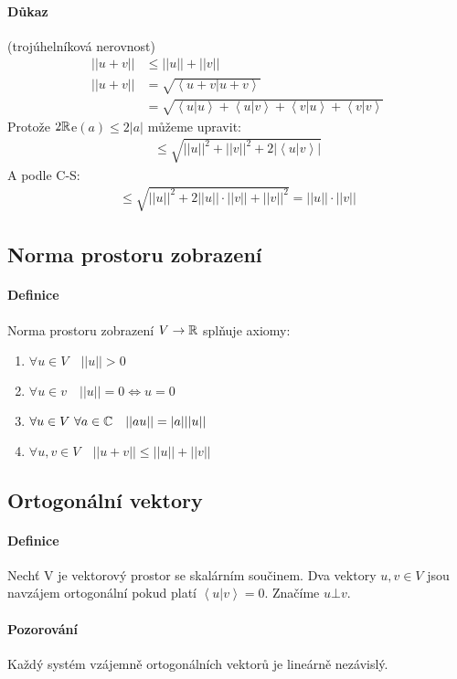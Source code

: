 \documentclass[a4paper,10pt]{article}
\begin{document}
\paragraph{Důkaz} (trojúhelníková nerovnost)
\begin{align}
	||u+v|| &\le ||u|| + ||v|| \\
	||u+v|| &= \sqrt{\left<u+v|u+v\right>}\\
	&=\sqrt{\left<u|u\right> + \left<u|v\right> + \left<v|u\right> + \left<v|v\right>}
\end{align}
Protože $2 \mathbb{R} $e$(a) \le 2|a|$ můžeme upravit:
\begin{align}
	\le \sqrt{||u||^2 + ||v||^2 + 2|\left<u|v\right>|}
\end{align}
A podle C-S:
\begin{align}
	\le \sqrt{||u||^2 + 2||u|| \cdot ||v|| + ||v||^2} = ||u|| \cdot ||v||
\end{align}


\subsection{Norma prostoru zobrazení}
\setcounter{equation}{0}
\paragraph{Definice}
Norma prostoru zobrazení $V \to \mathbb{R}$ splňuje axiomy:
\begin{enumerate}
	\item $\forall u \in V \quad ||u|| \gt 0$
	\item $\forall u \in v \quad ||u|| = 0 \Leftrightarrow u = 0$
	\item $\forall u \in V \ \forall a \in \mathbb{C} \quad ||au|| = |a| ||u||$
	\item $\forall u,v \in V \quad ||u+v|| \le ||u|| + ||v||$
\end{enumerate}



\subsection{Ortogonální vektory}
\setcounter{equation}{0}
\paragraph{Definice}
Nechť V je vektorový prostor se skalárním součinem. Dva vektory $u, v \in V$
jsou navzájem ortogonální pokud platí $\left<u|v\right> = 0$. Značíme $u\bot v$.
\paragraph{Pozorování}
Každý systém vzájemně ortogonálních vektorů je lineárně nezávislý.
\end{document}
